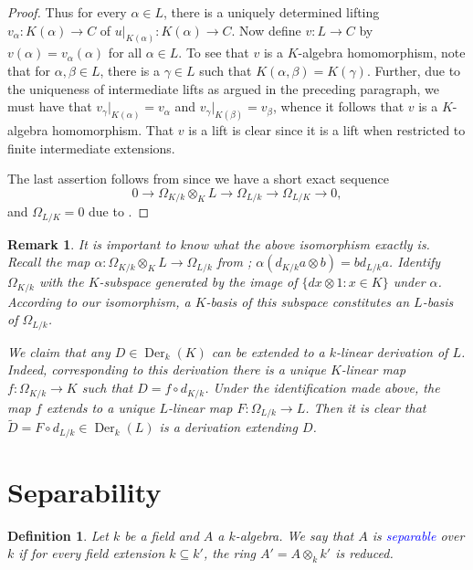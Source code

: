 \documentclass[10pt]{article}
\theoremstyle{thmstyle}
\theoremstyle{defstyle}
\newtheorem{definition}[theorem]{Definition}
\newtheorem{remark}[theorem]{Remark}
\newcommand{\wt}[1]{\widetilde{#1}}
\newcommand{\define}[1]{\textcolor{blue}{\textit{#1}}}
\newcommand{\Der}{\operatorname{Der}}
\begin{document}
\begin{proof}
    Thus for every $\alpha\in L$, there is a uniquely determined lifting $v_\alpha\colon K(\alpha)\to C$ of $u|_{K(\alpha)}\colon K(\alpha)\to C$. Now define $v\colon L\to C$ by $v(\alpha) = v_\alpha(\alpha)$ for all $\alpha\in L$. To see that $v$ is a $K$-algebra homomorphism, note that for $\alpha,\beta\in L$, there is a $\gamma\in L$ such that $K(\alpha, \beta) = K(\gamma)$. Further, due to the uniqueness of intermediate lifts as argued in the preceding paragraph, we must have that $v_\gamma|_{K(\alpha)} = v_\alpha$ and $v_\gamma|_{K(\beta)} = v_\beta$, whence it follows that $v$ is a $K$-algebra homomorphism. That $v$ is a lift is clear since it is a lift when restricted to finite intermediate extensions.

    The last assertion follows from  since we have a short exact sequence 
    \begin{equation*}
        0\to\Omega_{K/k}\otimes_K L\to\Omega_{L/k}\to\Omega_{L/K}\to 0,
    \end{equation*}
    and $\Omega_{L/K} = 0$ due to .
\end{proof}

\begin{remark}
    It is important to know what the above isomorphism exactly is. Recall the map $\alpha\colon\Omega_{K/k}\otimes_K L\to\Omega_{L/k}$ from ; $\alpha(d_{K/k}a\otimes b) = bd_{L/k} a$. Identify $\Omega_{K/k}$ with the $K$-subspace generated by the image of $\{dx\otimes 1\colon x\in K\}$ under $\alpha$. According to our isomorphism, a $K$-basis of this subspace constitutes an $L$-basis of $\Omega_{L/k}$.

    We claim that any $D\in\Der_k(K)$ can be extended to a $k$-linear derivation of $L$. Indeed, corresponding to this derivation there is a unique $K$-linear map $f\colon\Omega_{K/k}\to K$ such that $D = f\circ d_{K/k}$. Under the identification made above, the map $f$ extends to a unique $L$-linear map $F\colon\Omega_{L/k}\to L$. Then it is clear that $\wt D = F\circ d_{L/k}\in\Der_k(L)$ is a derivation extending $D$.
\end{remark}

\section{Separability}

\begin{definition}
    Let $k$ be a field and $A$ a $k$-algebra. We say that $A$ is \define{separable} over $k$ if for every field extension $k\subseteq k'$, the ring $A' = A\otimes_k k'$ is reduced. 
\end{definition}
\end{document}
